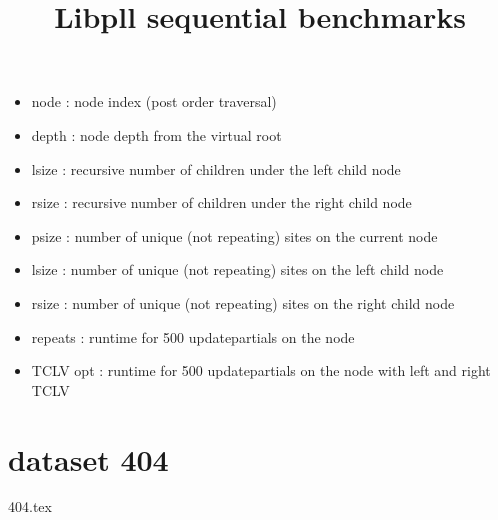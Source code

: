 \documentclass[a4paper]{article}
\begin{document}
\newcommand*{\figuretitle}[1]{%
    {\centering%
    \textbf{#1}%
    \par\medskip}%
}


\title{Libpll sequential benchmarks}
\maketitle


\begin{itemize}
\item node : node index (post order traversal)
\item depth : node depth from the virtual root
\item lsize : recursive number of children under the left child node
\item rsize : recursive number of children under the right child node
\item psize : number of unique (not repeating) sites on the current node
\item lsize : number of unique (not repeating) sites on the left child node
\item rsize : number of unique (not repeating) sites on the right child node
\item repeats : runtime for 500 updatepartials on the node
\item TCLV opt : runtime for 500 updatepartials on the node with left and right TCLV
\end{itemize}

\section{dataset 404}
{404.tex}
%
%
\end{document}
